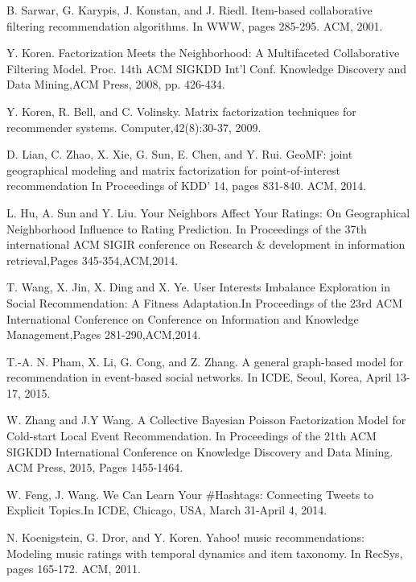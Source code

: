 \documentclass{llncs}
\begin{document}
\begin{thebibliography}{[10]}
		B. Sarwar, G. Karypis, J. Konstan, and J. Riedl. Item-based
		collaborative filtering recommendation algorithms. In WWW,
		pages 285-295. ACM, 2001.

		Y. Koren. Factorization Meets the Neighborhood: A Multifaceted Collaborative Filtering Model. Proc. 14th ACM
		SIGKDD Int'l Conf. Knowledge Discovery and Data Mining,ACM Press, 2008, pp. 426-434.
		
		Y. Koren, R. Bell, and C. Volinsky. Matrix factorization
		techniques for recommender systems. Computer,42(8):30-37, 2009.

		D. Lian, C. Zhao, X. Xie, G. Sun, E. Chen, and Y. Rui. GeoMF: joint geographical modeling and matrix factorization for point-of-interest recommendation
		In Proceedings of KDD' 14, pages 831-840. ACM, 2014.

		L. Hu, A. Sun and Y. Liu. Your Neighbors Affect Your Ratings: On Geographical
		Neighborhood Influence to Rating Prediction. In Proceedings of the 37th international ACM SIGIR conference on Research \& development in information retrieval,Pages 345-354,ACM,2014.
		
		T. Wang, X. Jin, X. Ding and X. Ye. User Interests Imbalance Exploration in Social
		Recommendation: A Fitness Adaptation.In Proceedings of the 23rd ACM International Conference on Conference on Information and Knowledge Management,Pages 281-290,ACM,2014.

		T.-A. N. Pham, X. Li, G. Cong, and Z. Zhang. A general
		graph-based model for recommendation in event-based social
		networks. In ICDE, Seoul, Korea, April 13-17, 2015.
		
		W. Zhang and J.Y Wang. A Collective Bayesian Poisson Factorization Model for Cold-start Local Event Recommendation.
		In Proceedings of the 21th ACM SIGKDD International Conference on Knowledge Discovery and Data Mining.
		ACM Press, 2015, Pages 1455-1464. 	
		
		W. Feng, J. Wang. We Can Learn Your \#Hashtags: Connecting Tweets to Explicit Topics.In ICDE, Chicago, USA, March 31-April 4, 2014.

		
		N. Koenigstein, G. Dror, and Y. Koren. Yahoo! music
		recommendations: Modeling music ratings with temporal
		dynamics and item taxonomy. In RecSys, pages 165-172.
		ACM, 2011.


\end{thebibliography}
\end{document}

